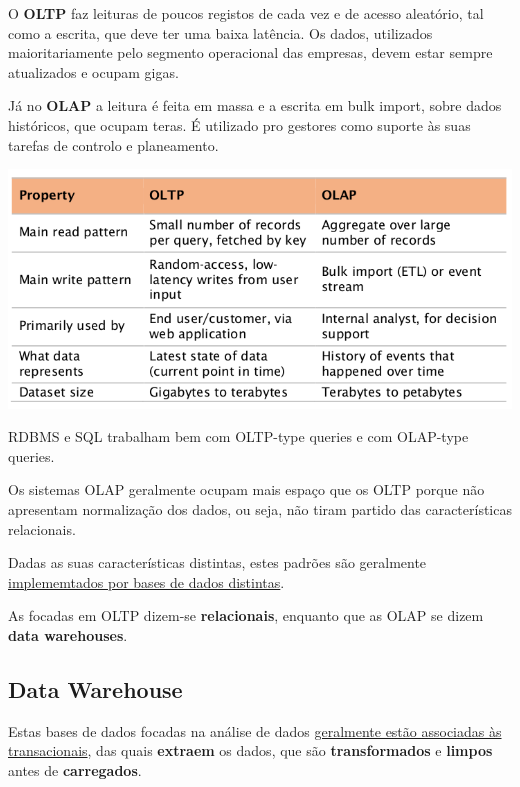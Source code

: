 \documentclass{article}
\begin{document}
O \textbf{OLTP} faz leituras de poucos registos de cada vez e de acesso aleatório, tal como a escrita,
que deve ter uma baixa latência. Os dados, utilizados maioritariamente pelo segmento
operacional das empresas, devem estar sempre atualizados e ocupam gigas.

\vspace{2mm}

Já no \textbf{OLAP} a leitura é feita em massa e a escrita em
bulk import, sobre dados históricos, que
ocupam teras. É utilizado pro gestores como suporte às suas tarefas de controlo e
planeamento.

\begin{center}
  \includegraphics[scale=0.3]{48}
\end{center}

RDBMS e SQL trabalham bem com OLTP-type queries e com OLAP-type queries.

Os sistemas OLAP geralmente ocupam mais espaço que os OLTP porque não apresentam
normalização dos dados, ou seja, não tiram partido das características relacionais.

Dadas as suas características distintas, estes padrões são geralmente \uline{implememtados por
bases de dados distintas}.

As focadas em OLTP dizem-se \textbf{relacionais}, enquanto que as OLAP se dizem \textbf{data warehouses}.

\pagebreak

\subsection{Data Warehouse}

Estas bases de dados focadas na análise de dados \uline{geralmente estão associadas às
transacionais}, das quais \textbf{extraem} os dados, que são \textbf{transformados} e \textbf{limpos} antes de
\textbf{carregados}.
\end{document}
